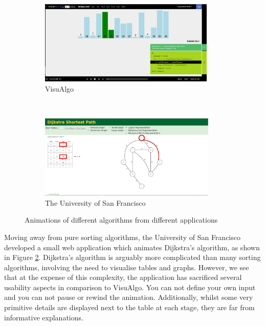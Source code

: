 \documentclass{l4proj}
\begin{document}
\begin{figure}
	\centering
	\begin{subfigure}[b]{0.45\textwidth}
		\includegraphics[height=4cm,width=\linewidth]{images/visualgo.png}
		\caption{VisuAlgo}
		\label{fig:visualgo}
	\end{subfigure}
	~
	\begin{subfigure}[b]{0.45\textwidth}
		\includegraphics[height=4cm,width=\linewidth]{images/dijkstra.png}
		\caption{The University of San Francisco}
		\label{fig:dijkstra}
	\end{subfigure}
	\caption{Animations of different algorithms from different applications}\label{fig:visualgo-dijkstra}	
\end{figure}


Moving away from pure sorting algorithms, the University of San Francisco developed a small web application which animates Dijkstra's algorithm\cite{dijkstra}, as shown in Figure \ref{fig:dijkstra}. Dijkstra's algorithm is arguably more complicated than many sorting algorithms, involving the need to visualise tables and graphs. However, we see that at the expense of this complexity, the application has sacrificed several usability aspects in comparison to VisuAlgo. You can not define your own input and you can not pause or rewind the animation. Additionally, whilst some very primitive details are displayed next to the table at each stage, they are far from informative explanations. 
\end{document}
